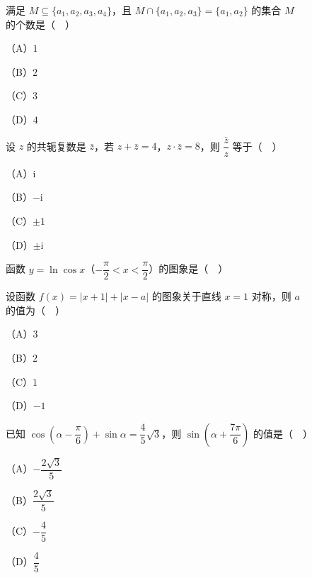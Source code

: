 


\begin{question}
满足 $M\subseteq\{a_1,a_2,a_3,a_4\}$，且 $M\cap\{a_1,a_2,a_3\}=\{a_1,a_2\}$ 的集合 $M$ 的个数是（　）

（A）$1$

（B）$2$

（C）$3$

（D）$4$

\end{question}
\begin{question}
设 $z$ 的共轭复数是 $\bar z$，若 $z+\bar z=4$，$z\cdot\bar z=8$，则 $\dfrac{\bar z}{z}$ 等于（　）

（A）$\mathrm i$

（B）$-\mathrm i$

（C）$\pm1$

（D）$\pm\mathrm i$

\Needspace{0.4\textheight}
\end{question}
\begingroup
\renewenvironment{question}{\Needspace{0.42\textheight}}{}
\begin{question}
函数 $y=\ln\cos x$（$-\dfrac{\pi}{2}<x<\dfrac{\pi}{2}$）的图象是（　）
\nopagebreak[4]
\begin{center}\end{center}
\nopagebreak[4]
\end{question}
\endgroup
\begin{question}
设函数 $f(x)=|x+1|+|x-a|$ 的图象关于直线 $x=1$ 对称，则 $a$ 的值为（　）

（A）$3$

（B）$2$

（C）$1$

（D）$-1$

\end{question}
\begin{question}
已知 $\cos\left(\alpha-\dfrac{\pi}{6}\right)+\sin\alpha=\dfrac45\sqrt3$，则 $\sin\left(\alpha+\dfrac{7\pi}{6}\right)$ 的值是（　）

（A）$-\dfrac{2\sqrt3}5$

（B）$\dfrac{2\sqrt3}5$

（C）$-\dfrac45$

（D）$\dfrac45$

\Needspace{0.4\textheight}
\end{question}
